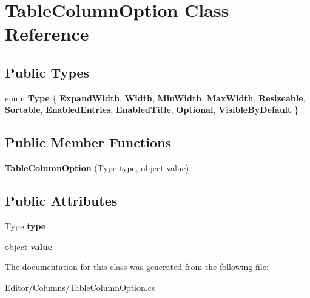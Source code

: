 \hypertarget{class_table_column_option}{}\section{Table\+Column\+Option Class Reference}
\label{class_table_column_option}
\subsection*{Public Types}
\begin{DoxyCompactItemize}
\item 
\mbox{\label{class_table_column_option_abf345bf5e5f731d15fc65f293b216771}} 
enum {\bfseries Type} \{ \newline
{\bfseries Expand\+Width}, 
{\bfseries Width}, 
{\bfseries Min\+Width}, 
{\bfseries Max\+Width}, 
\newline
{\bfseries Resizeable}, 
{\bfseries Sortable}, 
{\bfseries Enabled\+Entries}, 
{\bfseries Enabled\+Title}, 
\newline
{\bfseries Optional}, 
{\bfseries Visible\+By\+Default}
 \}
\end{DoxyCompactItemize}
\subsection*{Public Member Functions}
\begin{DoxyCompactItemize}
\item 
\mbox{\label{class_table_column_option_a5f4b1c640debbbeab7c3d82ce3a5121c}} 
{\bfseries Table\+Column\+Option} (Type type, object value)
\end{DoxyCompactItemize}
\subsection*{Public Attributes}
\begin{DoxyCompactItemize}
\item 
\mbox{\label{class_table_column_option_a973f227204e417026b25ed7701caf2dd}} 
Type {\bfseries type}
\item 
\mbox{\label{class_table_column_option_ae6647b311841ac2884737b6825fdd7bb}} 
object {\bfseries value}
\end{DoxyCompactItemize}


The documentation for this class was generated from the following file\+:\begin{DoxyCompactItemize}
\item 
Editor/\+Columns/Table\+Column\+Option.\+cs\end{DoxyCompactItemize}
